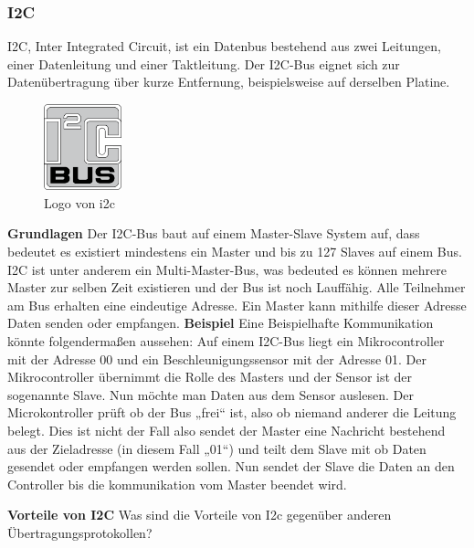 \subsubsection{I2C}
\label{subsec:I2C}
I2C, Inter Integrated Circuit, ist ein Datenbus bestehend aus zwei Leitungen, einer Datenleitung und einer Taktleitung. Der I2C-Bus eignet sich zur Datenübertragung über kurze Entfernung, beispielsweise auf derselben Platine.

\begin{figure}
  \begin{center}
    \includegraphics[width=0.2\textwidth]{images/i2c}
  \end{center}
  \caption{Logo von i2c \cite{PERT.CH2-i2c.logo}}\label{Fig:imgi2cLogo}
\end{figure}

\textbf{Grundlagen\newline}
Der I2C-Bus baut auf einem Master-Slave System auf, dass bedeutet es existiert mindestens ein Master und bis zu 127 Slaves auf einem Bus. I2C ist unter anderem ein Multi-Master-Bus, was bedeuted es können mehrere Master zur selben Zeit existieren und der Bus ist noch Lauffähig.
Alle Teilnehmer am Bus erhalten eine eindeutige Adresse. Ein Master kann mithilfe dieser Adresse Daten senden oder empfangen.
\nextline
\textbf{Beispiel\nextline}
Eine Beispielhafte Kommunikation könnte folgendermaßen aussehen:
\nextline
Auf einem I2C-Bus liegt ein Mikrocontroller mit der Adresse 00 und ein Beschleunigungssensor mit der Adresse 01. Der Mikrocontroller übernimmt die Rolle des Masters und der Sensor ist der sogenannte Slave. Nun möchte man Daten aus dem Sensor auslesen. Der Microkontroller prüft ob der Bus „frei“ ist, also ob niemand anderer die Leitung belegt. Dies ist nicht der Fall also sendet der Master eine Nachricht bestehend aus der Zieladresse (in diesem Fall „01“) und teilt dem Slave mit ob Daten gesendet oder empfangen werden sollen. Nun sendet der Slave die Daten an den Controller bis die kommunikation vom Master beendet wird.\newline


\textbf{Vorteile von I2C\nextline}
Was sind die Vorteile von I2c gegenüber anderen Übertragungsprotokollen?

